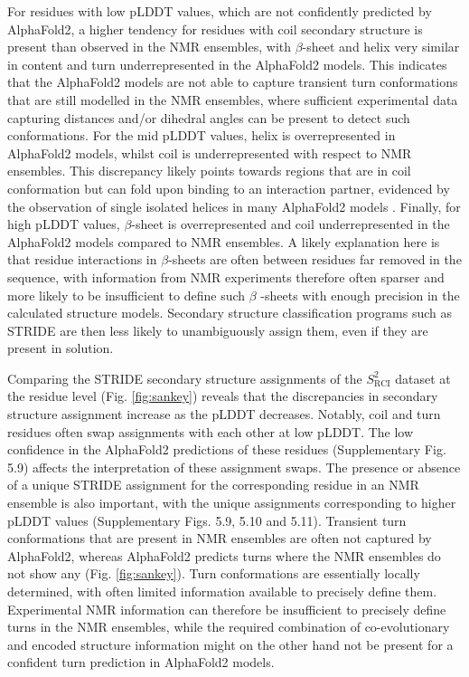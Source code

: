 For residues with low pLDDT values, which are not confidently predicted by AlphaFold2, a higher tendency for residues with coil secondary structure is present than observed in the NMR ensembles, with $\beta$-sheet and helix very similar in content and turn underrepresented in the AlphaFold2 models. This indicates that the AlphaFold2 models are not able to capture transient turn conformations that are still modelled in the NMR ensembles, where sufficient experimental data capturing distances and/or dihedral angles can be present to detect such conformations. For the mid pLDDT values, helix is overrepresented in AlphaFold2 models, whilst coil is underrepresented with respect to NMR ensembles. This discrepancy likely points towards regions that are in coil conformation but can fold upon binding to an interaction partner, evidenced by the observation of single isolated helices in many AlphaFold2 models \cite{fossat_uncovering_2023}. Finally, for high pLDDT values, {$\beta$}-sheet is overrepresented and coil underrepresented in the AlphaFold2 models compared to NMR ensembles. A likely explanation here is that residue interactions in {$\beta$}-sheets are often between residues far removed in the sequence, with information from NMR experiments therefore often sparser and more likely to be insufficient to define such $\beta$ -sheets with enough precision in the calculated structure models. Secondary structure classification programs such as STRIDE are then less likely to unambiguously assign them, even if they are present in solution.

Comparing the STRIDE secondary structure assignments of the $S^2_{\text{RCI}}$ dataset at the residue level (Fig. \ref{fig:sankey}) reveals that the discrepancies in secondary structure assignment increase as the pLDDT decreases. Notably, coil and turn residues often swap assignments with each other at low pLDDT. The low confidence in the AlphaFold2 predictions of these residues (Supplementary Fig. 5.9)
affects the interpretation of these assignment swaps. The presence or absence of a unique STRIDE assignment for the corresponding residue in an NMR ensemble is also important, with the unique assignments corresponding to higher pLDDT values (Supplementary Figs. 5.9, 5.10 and 5.11).
Transient turn conformations that are present in NMR ensembles are often not captured by AlphaFold2, whereas AlphaFold2 predicts turns where the NMR ensembles do not show any (Fig. \ref{fig:sankey}). Turn conformations are essentially locally determined, with often limited information available to precisely define them. Experimental NMR information can therefore be insufficient to precisely define turns in the NMR ensembles, while the required combination of co-evolutionary and encoded structure information might on the other hand not be present for a confident turn prediction in AlphaFold2 models.

